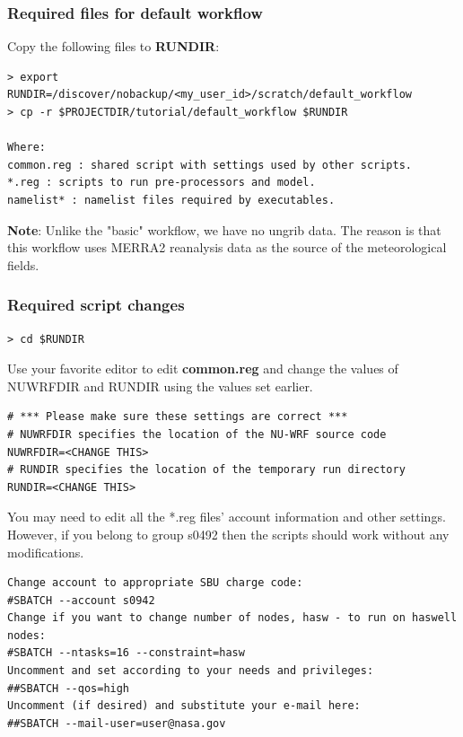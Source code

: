 \begin{frame}[fragile]\frametitle{Required files for default workflow}

Copy the following files to \textbf{RUNDIR}:
\begin{lstlisting}
> export RUNDIR=/discover/nobackup/<my_user_id>/scratch/default_workflow
> cp -r $PROJECTDIR/tutorial/default_workflow $RUNDIR

Where:
common.reg : shared script with settings used by other scripts.
*.reg : scripts to run pre-processors and model.
namelist* : namelist files required by executables.
\end{lstlisting}
\textbf{Note}: Unlike the "basic" workflow, we have no ungrib data. The reason is  that this workflow uses MERRA2 reanalysis data as the source of the meteorological fields.
\end{frame}

\begin{frame}[fragile]
\frametitle{Required script changes}
\verbatimfont{\scriptsize}%
\begin{verbatim}
> cd $RUNDIR
\end{verbatim}
Use your favorite editor to edit \textbf{common.reg} and change the values of NUWRFDIR and RUNDIR using the values set earlier.
\verbatimfont{\scriptsize}%
\begin{verbatim}
# *** Please make sure these settings are correct ***
# NUWRFDIR specifies the location of the NU-WRF source code
NUWRFDIR=<CHANGE THIS>
# RUNDIR specifies the location of the temporary run directory
RUNDIR=<CHANGE THIS>
\end{verbatim}
You may need to edit all the *.reg files' account information and other settings. However, if you belong to group s0492 then the scripts should work without any modifications.
\verbatimfont{\scriptsize}%
\begin{verbatim}
Change account to appropriate SBU charge code:
#SBATCH --account s0942 
Change if you want to change number of nodes, hasw - to run on haswell nodes:
#SBATCH --ntasks=16 --constraint=hasw
Uncomment and set according to your needs and privileges:
##SBATCH --qos=high 
Uncomment (if desired) and substitute your e-mail here:
##SBATCH --mail-user=user@nasa.gov 
\end{verbatim}

\end{frame}

